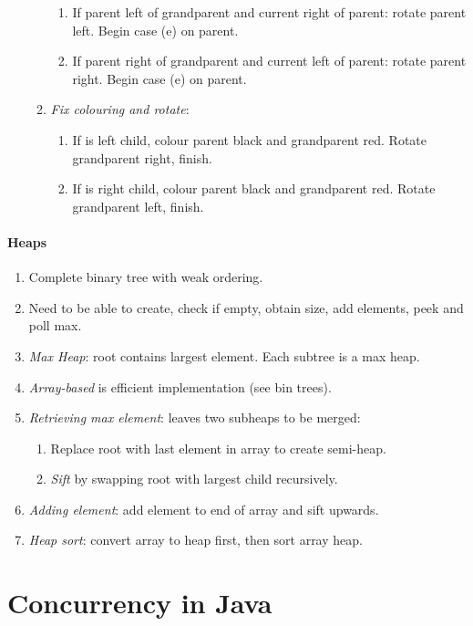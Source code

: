 \documentclass[twocolumn,english]{article}
\begin{document}
\begin{enumerate}
\begin{enumerate}
\begin{enumerate}
\item If parent left of grandparent and current right of parent: rotate
parent left. Begin case (e) on parent. 
\item If parent right of grandparent and current left of parent: rotate
parent right. Begin case (e) on parent.
\end{enumerate}
\item \emph{Fix colouring and rotate}:

\begin{enumerate}
\item If is left child, colour parent black and grandparent red. Rotate
grandparent right, finish.
\item If is right child, colour parent black and grandparent red. Rotate
grandparent left, finish.
\end{enumerate}
\end{enumerate}
\end{enumerate}

\paragraph{Heaps}
\begin{enumerate}
\item Complete binary tree with weak ordering.
\item Need to be able to create, check if empty, obtain size, add elements,
peek and poll max.
\item \emph{Max Heap}: root contains largest element. Each subtree is a
max heap.
\item \emph{Array-based} is efficient implementation (see bin trees).
\item \emph{Retrieving max element}: leaves two subheaps to be merged:

\begin{enumerate}
\item Replace root with last element in array to create semi-heap.
\item \emph{Sift} by swapping root with largest child recursively.
\end{enumerate}
\item \emph{Adding element}: add element to end of array and sift upwards.
\item \emph{Heap sort}: convert array to heap first, then sort array heap.
\end{enumerate}

\section{Concurrency in Java}
\end{document}
